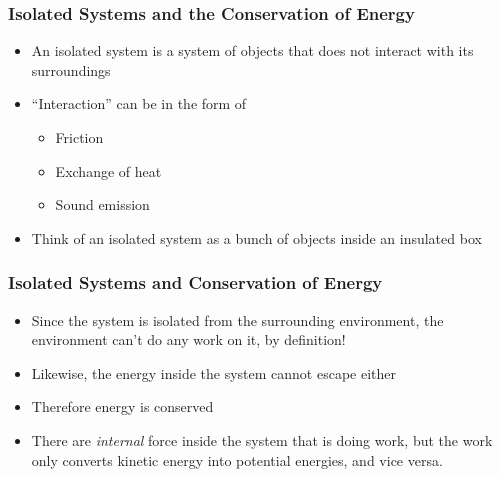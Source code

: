 \documentclass[12pt,compress,aspectratio=169]{beamer}
\begin{document}
\begin{frame}
  \frametitle{Isolated Systems and the Conservation of Energy}
  \begin{itemize}
  \item An isolated system is a system of objects that does not interact with
    its surroundings
  \item ``Interaction'' can be in the form of
    \begin{itemize}
    \item Friction
    \item Exchange of heat
    \item Sound emission
    \end{itemize}
  \item Think of an isolated system as a bunch of objects inside an insulated
    box
  \end{itemize}
  \begin{center}
  \end{center}
\end{frame}


\begin{frame}
  \frametitle{Isolated Systems and Conservation of Energy}
  \begin{itemize}
  \item Since the system is isolated from the surrounding environment, the
    environment can't do any work on it, by definition!
  \item Likewise, the energy inside the system cannot escape either
  \item Therefore energy is conserved
  \item There are \emph{internal} force inside the system that is doing work,
    but the work only converts kinetic energy into potential energies, and vice
    versa.
  \end{itemize}
\end{frame}
\end{document}
